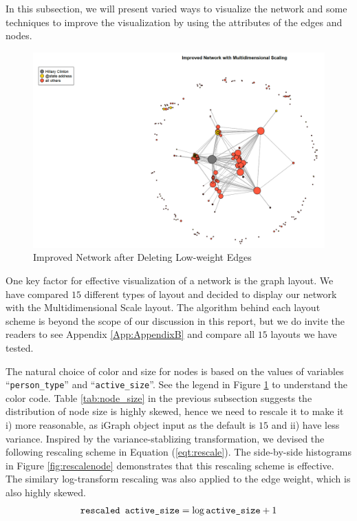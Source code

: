 In this subsection, we will present varied ways to visualize the network and some techniques to improve the visualization by using the attributes of the edges and nodes.

\begin{figure}[ht]
\centering
\includegraphics[width = 1\textwidth]{zoe/report_dms_layout}
\caption{Improved Network after Deleting Low-weight Edges}
\label{fig:improvednw}
\end{figure}

One key factor for effective visualization of a network is the graph layout. We have compared $15$ different types of layout and decided to display our network with the Multidimensional Scale layout. The algorithm behind each layout scheme is beyond the scope of our discussion in this report, but we do invite the readers to see Appendix \ref{App:AppendixB}  and compare all $15$ layouts we have tested.

The natural choice of color and size for nodes is based on the values of variables ``\verb+person_type+'' and ``\verb+active_size+''. See the legend in Figure \ref{fig:improvednw} to understand the color code. Table \ref{tab:node_size} in the previous subsection suggests the distribution of node size is highly skewed, hence we need to rescale it to make it i) more reasonable, as iGraph object input as the default is $15$ and ii) have less variance. Inspired by the variance-stablizing transformation, we devised the following rescaling scheme in Equation (\ref{eqt:rescale}). The side-by-side histograms in Figure \ref{fig:rescalenode} demonstrates that this rescaling scheme is effective. The similary log-transform rescaling was also applied to the edge weight, which is also highly skewed.
\begin{equation}
\label{eqt:rescale}
\verb+rescaled active_size+ = \log \verb+active_size+ + 1
\end{equation}

